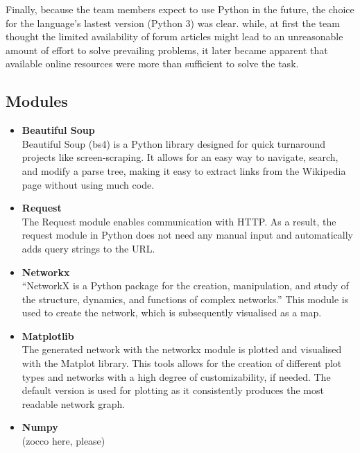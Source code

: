 \documentclass[10pt]{article}
\begin{document}
\noindent Finally, because the team members expect to use Python in the future, the choice for the language's lastest version (Python 3) was clear. while, at first the team thought the limited availability of forum articles might lead to an unreasonable amount of effort to solve prevailing problems, it later became apparent that available online resources were more than sufficient to solve the task. 




\subsection{Modules}

 \begin{itemize}    %
        \item\textbf{Beautiful Soup}\\
	Beautiful Soup (bs4) is a Python library designed for quick turnaround projects like screen-scraping. It allows for an easy way to navigate, search, and modify a parse tree, making  	it easy to extract links from the Wikipedia page without using much code. \cite{cru} 
 
        \item \textbf{Request}\\
 	The Request module enables communication with HTTP. As a result, the request module in Python does not need any manual input and automatically adds query strings to the  	
	URL.   \cite{req}
	
        \item \textbf{Networkx}\\
	``NetworkX is a Python package for the creation, manipulation, and study of the structure, dynamics, and functions of complex networks.'' \cite{net} This module is used to create 
	the network, which is subsequently visualised as a map. 
	
        \item \textbf{Matplotlib}\\
        The generated network with the networkx module is plotted and visualised with the Matplot library. This tools allows for the creation of different plot types and networks with a high 	
        degree of customizability, if needed. The default version is used for plotting as it consistently produces the most readable network graph. 
        
        \item \textbf{Numpy}\\
        
        (zocco here, please)
        
        
    \end{itemize}
 
\end{document}
